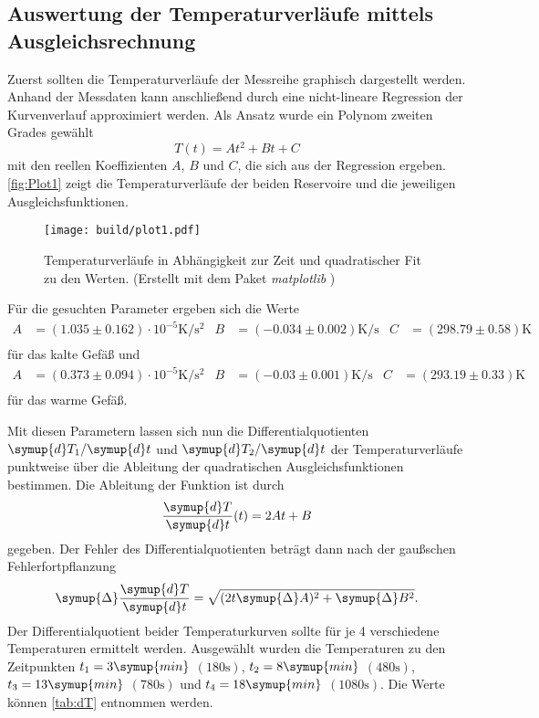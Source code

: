 \subsection{Auswertung der Temperaturverläufe mittels Ausgleichsrechnung}
\label{subsec:Temperaturverlauf}
Zuerst sollten die Temperaturverläufe der Messreihe graphisch dargestellt werden. Anhand der Messdaten kann anschließend durch eine nicht-lineare Regression der Kurvenverlauf 
approximiert werden. Als Ansatz wurde ein Polynom zweiten Grades gewählt
\begin{equation*}
  T(t) = At^2 + Bt + C
\end{equation*}
mit den reellen Koeffizienten $A$, $B$ und $C$, die sich aus der Regression ergeben. \autoref{fig:Plot1} zeigt die Temperaturverläufe der beiden Reservoire
und die jeweiligen Ausgleichsfunktionen.
\begin{figure}
  \caption{Temperaturverläufe in Abhängigkeit zur Zeit und quadratischer Fit zu den Werten. (Erstellt mit dem Paket \textit{matplotlib} \cite{matplotlib})}
  \label{fig:Plot1}
  \centering
  \texttt{[image: build/plot1.pdf]}
\end{figure}

Für die gesuchten Parameter ergeben sich die Werte
\begin{align*}
  A &= (1.035 \pm 0.162)\cdot 10^{-5} \unit{\kelvin\per\second\squared} & B &= (-0.034 \pm 0.002) \unit{\kelvin\per\second} & C &= (298.79 \pm 0.58) \unit{\kelvin} \\
\end{align*}
für das kalte Gefäß und 
\begin{align*}
  A &= (0.373 \pm 0.094)\cdot 10^{-5} \unit{\kelvin\per\second\squared} & B &= (-0.03 \pm 0.001) \unit{\kelvin\per\second} & C &= (293.19 \pm 0.33) \unit{\kelvin} \\
\end{align*}
für das warme Gefäß.

Mit diesen Parametern lassen sich nun die Differentialquotienten $\symup{d}T_1/\symup{d}t$ und $\symup{d}T_2/\symup{d}t$ der Temperaturverläufe punktweise über
die Ableitung der quadratischen Ausgleichsfunktionen bestimmen.
Die Ableitung der Funktion ist durch
\begin{equation*}
  \frac{\symup{d}T}{\symup{d}t} (t) = 2 At + B
\end{equation*}
gegeben. Der Fehler des Differentialquotienten beträgt dann nach der gaußschen Fehlerfortpflanzung 
\begin{equation*}
  \symup{\Delta} \frac{\symup{d}T}{\symup{d}t} = \sqrt{(2t\symup{\Delta}A)^2 + \symup{\Delta}B^2}.
\end{equation*}
Der Differentialquotient beider Temperaturkurven sollte für je 4 verschiedene Temperaturen ermittelt werden. Ausgewählt wurden die Temperaturen zu den Zeitpunkten
$t_1 = 3 \symup{min}$ $(180 \unit{\second})$, $t_2 = 8 \symup{min}$ $(480 \unit{\second})$, $t_3 = 13 \symup{min}$ $(780 \unit{\second})$ und 
$t_4 = 18 \symup{min}$ $(1080 \unit{\second})$. Die Werte können \autoref{tab:dT} entnommen werden.


